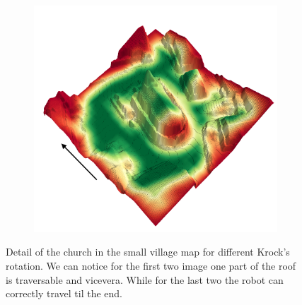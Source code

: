 \documentclass[../document.tex]{subfiles}
\begin{document}
\begin{figure} [htbp]
\begin{subfigure}[b]{0.45\textwidth}
    \end{subfigure}
    \begin{subfigure}[b]{0.45\textwidth}
        \includegraphics[width=\linewidth]{../img/4/traversability/sullens-church/-180.png}  
    \end{subfigure}
    \caption{Detail of the church in the small village map for different Krock's rotation. We can notice for the first two image one part of the roof is traversable and vicevera. While for the last two the robot can correctly travel til the end.}
    \end{figure}
\end{document}
